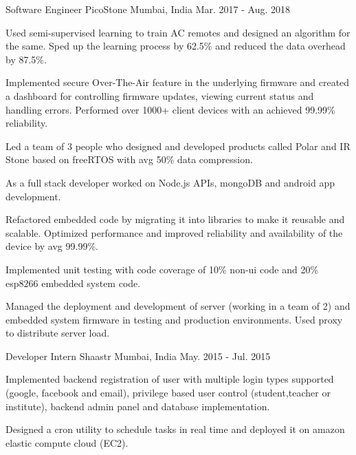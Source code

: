 

\begin{cventries}

	\cventry
	{Software Engineer} %
	{PicoStone} %
	{Mumbai, India} %
	{Mar. 2017 - Aug. 2018} %
	{ \begin{cvitems} %
	\item{Used semi-supervised learning to train AC remotes and designed an algorithm for the same. Sped up the learning process by 62.5\% and reduced the data overhead by 87.5\%.} %
      \item {Implemented secure Over-The-Air feature in the underlying firmware and created a dashboard for controlling firmware updates, viewing current status and handling errors. Performed over 1000+ client devices with an achieved 99.99\% reliability.}
      \item {Led a team of 3 people who designed and developed products called Polar and IR Stone based on freeRTOS with avg 50\% data compression.}  %
      \item {As a full stack developer worked on Node.js APIs, mongoDB and android app development.}    
      \item {Refactored embedded code by migrating it into libraries to make it reusable and scalable. Optimized performance and improved reliability and availability of the device by avg 99.99\%.}  %
      \item {Implemented unit testing with code coverage of 10\% non-ui code and 20\% esp8266 embedded system code.}
      \item {Managed the deployment and development of server (working in a team of 2) and embedded system firmware in testing and production environments. Used proxy to distribute server load.}
     \end{cvitems}
  }


	\cventry
	{Developer Intern} %
	{Shaastr } %
	{Mumbai, India} %
	{May. 2015 - Jul. 2015} %
	{
		\begin{cvitems} %
			\item {Implemented backend registration of user with multiple login types supported (google, facebook and email), privilege based user control (student,teacher or institute), backend admin panel and database implementation.}
			\item {Designed a cron utility to schedule tasks in real time and deployed it on amazon elastic compute cloud (EC2).}
		\end{cvitems}
	}

\end{cventries}